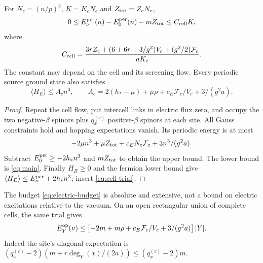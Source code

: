 \begin{proposition}
\label{prop:cell}
For $N_c=(n/p)^3$, $K=K_cN_c$ and $Z_{\rm tot}=Z_cN_c$,
\begin{equation}
 0\le E_\nu^{\rm per}(n)-E_0^{\rm per}(n)-mZ_{\rm tot}
 \le C_{\rm cell}K,
 \label{eq:cell-bound}
\end{equation}
where
\begin{equation}
 C_{\rm cell}
 =\frac{3rZ_c+(6+6r+3/g^2)V_c+(g^2/2)\mathcal F_c}{aK_c}.
 \label{eq:cell-constant}
\end{equation}
The constant may depend on the cell and its screening flow.
Every periodic source ground state also satisfies
\begin{equation}
 \langle H_E\rangle\le A_c n^3,\qquad
 A_c=2(h_*-\mu)+\mu\rho+c_E\mathcal F_c/V_c+3/(g^2a).
 \label{eq:electric-budget}
\end{equation}
\end{proposition}
\begin{proof}
Repeat the cell flow, put intercell links in electric flux zero,
and occupy the two negative-$\beta$ spinors plus
$q_x^{(c)}$ positive-$\beta$ spinors at each site.
All Gauss constraints hold and hopping expectations vanish.
Its periodic energy is at most
\begin{equation}
 -2\mu n^3+\mu Z_{\rm tot}
                 +c_EN_c\mathcal F_c+3n^3/(g^2a).
 \label{eq:cell-trial}
\end{equation}
Subtract $E_0^{\rm per}\ge-2h_*n^3$ and $mZ_{\rm tot}$
to obtain the upper bound. The lower bound is
\eqref{eq:main}. Finally $H_B\ge0$ and the fermion lower bound
give $\langle H_E\rangle\le E_\nu^{\rm per}+2h_*n^3$;
insert \eqref{eq:cell-trial}.
\end{proof}

The budget \eqref{eq:electric-budget} is absolute and extensive,
not a bound on electric excitations relative to the vacuum.
On an open rectangular union of complete cells, the same trial
gives
\begin{equation}
 E_Y^{\rm op}(\nu)\le
 \left[-2m+m\rho+c_E\mathcal F_c/V_c+3/(g^2a)\right]|Y|.
 \label{eq:open-cell-trial}
\end{equation}
Indeed the site's diagonal expectation is
$(q_x^{(c)}-2)(m+r\deg_Y(x)/(2a))\le(q_x^{(c)}-2)m$.

